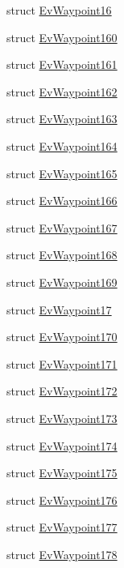 \begin{DoxyCompactItemize}
struct \hyperlink{structcl__move__base__z_1_1EvWaypoint16}{Ev\+Waypoint16}
\item 
struct \hyperlink{structcl__move__base__z_1_1EvWaypoint160}{Ev\+Waypoint160}
\item 
struct \hyperlink{structcl__move__base__z_1_1EvWaypoint161}{Ev\+Waypoint161}
\item 
struct \hyperlink{structcl__move__base__z_1_1EvWaypoint162}{Ev\+Waypoint162}
\item 
struct \hyperlink{structcl__move__base__z_1_1EvWaypoint163}{Ev\+Waypoint163}
\item 
struct \hyperlink{structcl__move__base__z_1_1EvWaypoint164}{Ev\+Waypoint164}
\item 
struct \hyperlink{structcl__move__base__z_1_1EvWaypoint165}{Ev\+Waypoint165}
\item 
struct \hyperlink{structcl__move__base__z_1_1EvWaypoint166}{Ev\+Waypoint166}
\item 
struct \hyperlink{structcl__move__base__z_1_1EvWaypoint167}{Ev\+Waypoint167}
\item 
struct \hyperlink{structcl__move__base__z_1_1EvWaypoint168}{Ev\+Waypoint168}
\item 
struct \hyperlink{structcl__move__base__z_1_1EvWaypoint169}{Ev\+Waypoint169}
\item 
struct \hyperlink{structcl__move__base__z_1_1EvWaypoint17}{Ev\+Waypoint17}
\item 
struct \hyperlink{structcl__move__base__z_1_1EvWaypoint170}{Ev\+Waypoint170}
\item 
struct \hyperlink{structcl__move__base__z_1_1EvWaypoint171}{Ev\+Waypoint171}
\item 
struct \hyperlink{structcl__move__base__z_1_1EvWaypoint172}{Ev\+Waypoint172}
\item 
struct \hyperlink{structcl__move__base__z_1_1EvWaypoint173}{Ev\+Waypoint173}
\item 
struct \hyperlink{structcl__move__base__z_1_1EvWaypoint174}{Ev\+Waypoint174}
\item 
struct \hyperlink{structcl__move__base__z_1_1EvWaypoint175}{Ev\+Waypoint175}
\item 
struct \hyperlink{structcl__move__base__z_1_1EvWaypoint176}{Ev\+Waypoint176}
\item 
struct \hyperlink{structcl__move__base__z_1_1EvWaypoint177}{Ev\+Waypoint177}
\item 
struct \hyperlink{structcl__move__base__z_1_1EvWaypoint178}{Ev\+Waypoint178}
\item 

\end{DoxyCompactItemize}
